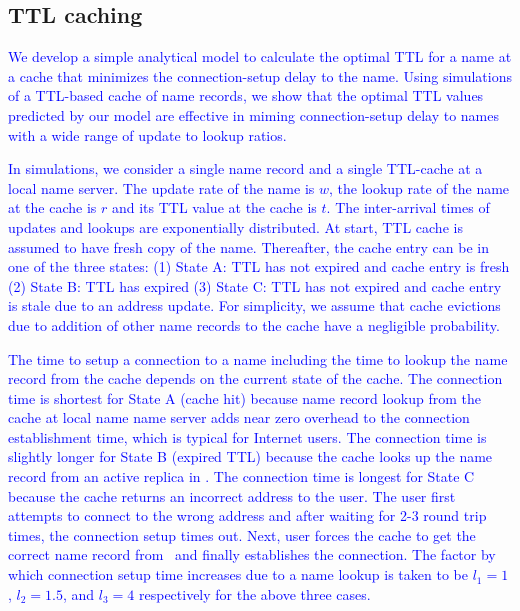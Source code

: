\subsection{TTL caching}

\textcolor{blue}{
We develop a simple analytical model to calculate the optimal TTL for a name at a cache that minimizes the connection-setup delay to the name. 
Using simulations of a TTL-based cache of name records, we show that the optimal TTL values predicted by our model are effective in miming connection-setup delay to names with a wide range of update to lookup ratios.}



\textcolor{blue}{
In simulations, we consider a single name record and a single TTL-cache at a local name server. 
The update rate of the name is $w$,   the lookup rate of the name at the cache is $r$ and its TTL value at the cache is $t$. 
The inter-arrival times of updates and lookups are exponentially distributed.
At start, TTL cache is assumed to have fresh copy of the name. 
Thereafter, the cache entry can be in one of the three states:  (1)  State A: TTL has not expired and cache entry is fresh (2) State B: TTL has expired (3) State C: TTL has not expired and cache entry is stale due to an address update. For simplicity, we assume that cache evictions due to addition of other name records to the cache have a negligible probability.  }

\textcolor{blue}{
The time to setup a connection to a name including the time to lookup the name record from the cache depends on the current state of the cache. 
The connection time is shortest for State A (cache hit) because name record lookup from the cache at local name name server  adds near zero overhead to the connection establishment time, which is typical for Internet users.
The connection time is slightly longer for State B (expired TTL) because the cache looks up the name record from an active replica in \auspice. 
The connection time is longest for State C because the cache returns an incorrect address to the user. The user first attempts to connect to the wrong address and after waiting for 2-3 round trip times, the connection setup times out. Next, user forces the cache to get the correct name record from \auspice\ and finally establishes the connection. 
The factor by which connection setup time increases due to a name lookup is taken to be $l_1 = 1$, $l_2 = 1.5$, and $l_3 = 4$ respectively for the above three cases. 
}

